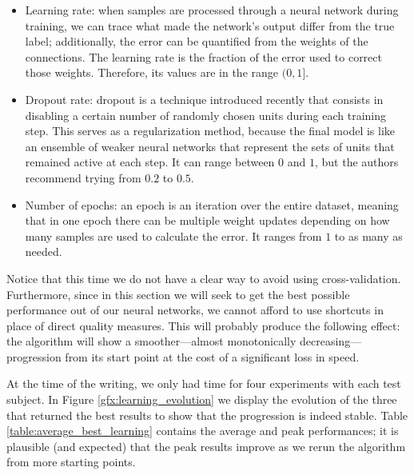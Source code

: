 	\begin{itemize}

		\item
		Learning rate: when samples are processed through a neural network during training, we can trace what made the network's output differ from the true label; additionally, the error can be quantified from the weights of the connections. The learning rate is the fraction of the error used to correct those weights. Therefore, its values are in the range $(0,1]$.

		\item
		Dropout rate: dropout is a technique introduced recently \cite{srivastava2014dropout} that consists in disabling a certain number of randomly chosen units during each training step. This serves as a regularization method, because the final model is like an ensemble of weaker neural networks that represent the sets of units that remained active at each step. It can range between $0$ and $1$, but the authors recommend trying from $0.2$ to $0.5$.

		\item
		Number of epochs: an epoch is an iteration over the entire dataset, meaning that in one epoch there can be multiple weight updates depending on how many samples are used to calculate the error. It ranges from $1$ to as many as needed.

	\end{itemize}

	Notice that this time we do not have a clear way to avoid using cross-validation. Furthermore, since in this section we will seek to get the best possible performance out of our neural networks, we cannot afford to use shortcuts in place of direct quality measures. This will probably produce the following effect: the algorithm will show a smoother---almost monotonically decreasing---progression from its start point at the cost of a significant loss in speed.

	At the time of the writing, we only had time for four experiments with each test subject. In Figure \ref{gfx:learning_evolution} we display the evolution of the three that returned the best results to show that the progression is indeed stable. Table \ref{table:average_best_learning} contains the average and peak performances; it is plausible (and expected) that the peak results improve as we rerun the algorithm from more starting points.

\newpage

